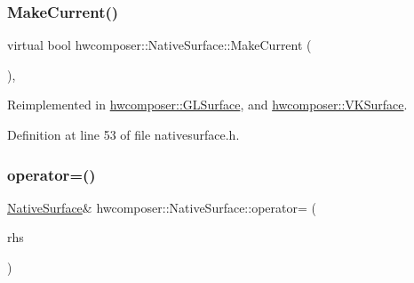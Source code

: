 \subsubsection{\texorpdfstring{Make\+Current()}{MakeCurrent()}}
{\footnotesize\ttfamily virtual bool hwcomposer\+::\+Native\+Surface\+::\+Make\+Current (\begin{DoxyParamCaption}{ }\end{DoxyParamCaption})\hspace{0.3cm}{\ttfamily [inline]}, {\ttfamily [virtual]}}



Reimplemented in \mbox{\hyperlink{classhwcomposer_1_1GLSurface_a5d2720365cbfe670344bc74831a7895a}{hwcomposer\+::\+G\+L\+Surface}}, and \mbox{\hyperlink{classhwcomposer_1_1VKSurface_a4df93ef0688ea34a96557da2ad411f53}{hwcomposer\+::\+V\+K\+Surface}}.



Definition at line 53 of file nativesurface.\+h.


\begin{DoxyCode}{0}
\end{DoxyCode}
\mbox{\label{classhwcomposer_1_1NativeSurface_ad293b1c21e9bc452744cde6595227433}} 
\subsubsection{\texorpdfstring{operator=()}{operator=()}}
{\footnotesize\ttfamily \mbox{\hyperlink{classhwcomposer_1_1NativeSurface}{Native\+Surface}}\& hwcomposer\+::\+Native\+Surface\+::operator= (\begin{DoxyParamCaption}\item[{const \mbox{\hyperlink{classhwcomposer_1_1NativeSurface}{Native\+Surface}} \&}]{rhs }\end{DoxyParamCaption})\hspace{0.3cm}{\ttfamily [delete]}}

\mbox{\label{classhwcomposer_1_1NativeSurface_a27af1f56db8a926c53c93d0e2035efe9}} 
